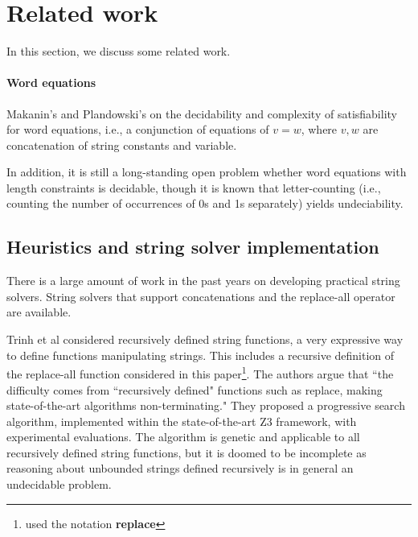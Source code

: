 
\section{Related work}

 
In this section, we discuss some related work. 

\paragraph{Word equations} Makanin's and Plandowski's  on the decidability
and complexity of satisfiability for word equations, i.e., a conjunction of equations of $v=w$, where $v, w$ are concatenation of string constants and variable. 

In addition, it is still a long-standing open problem whether word equations with length constraints is decidable, though it is known that letter-counting (i.e., counting the number of occurrences of 0s and 1s separately) yields undeciability.  

\subsection*{Heuristics and string solver implementation}

There is a large amount of work in the past years on developing practical string solvers. String solvers that support concatenations and the replace-all operator are available. \cite{BTV09, TCJ14, YABI14,TCJ16}


\cite{TCJ16} 
Trinh et al considered %
recursively defined string functions, a very expressive way to define functions manipulating strings. This includes a recursive definition of the replace-all function considered in this paper\footnote{\cite{TCJ16} used the notation \textbf{replace}}. The authors argue that ``the difficulty comes from ``recursively defined" functions such as replace, making state-of-the-art algorithms non-terminating." They proposed a progressive search algorithm, %
implemented within the state-of-the-art Z3 framework, with experimental evaluations. The algorithm is genetic and  applicable to all recursively defined string functions, but it is doomed to be incomplete as reasoning about unbounded strings defined recursively is in general an undecidable problem.   

